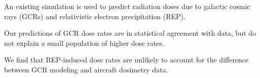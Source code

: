 \documentclass[draft]{agujournal2019}
\begin{document}

\begin{keypoints}
  \item An existing simulation is used to predict radiation doses due to galactic cosmic rays (GCRs) and relativistic electron precipitation (REP).
  \item Our predictions of GCR dose rates are in statistical agreement with data, but do not explain a small population of higher dose rates.
  \item We find that REP-induced dose rates are unlikely to account for the difference between GCR modeling and aircraft dosimetry data.
\end{keypoints}

%
%

%
%

\end{document}

